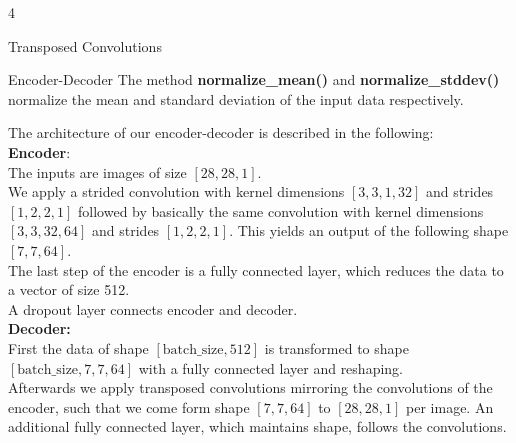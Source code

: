 \documentclass{article}
\begin{document}
    \begin{ukon-infie}[28.1.18]{4}

		
		\begin{exercise}[p=20]{Transposed Convolutions}
		\question{}
		{
			
		}
		\question{}
		{
			
		}
		\question{}
		{
			
		}
		\end{exercise}
		
		\begin{exercise}[p=60]{Encoder-Decoder}
		\question{}
		{
		The method \textbf{normalize\_mean()} and \textbf{normalize\_stddev()} normalize the mean and standard deviation of the input data respectively.
		}
		\question{}
		{		
		The architecture of our encoder-decoder is described in the following:\\
		\textbf{Encoder}:\\
		The inputs are images of size $[28 , 28 , 1]$.\\
		We apply a strided convolution with kernel dimensions $[3,3,1,32]$ and strides $[1,2,2,1]$ followed by basically the same convolution with kernel dimensions $[3,3,32,64]$ and strides $[1,2,2,1]$. This yields an output of the following shape $[7,7,64]$.\\
		The last step of the encoder is a fully connected layer, which reduces the data to a vector of size 512.\\
		A dropout layer connects encoder and decoder.\\
		
		\textbf{Decoder:}\\
		First the data of shape $[\text{batch\_size},512 ]$ is transformed to shape $[\text{batch\_size},7,7,64 ]$ with a fully connected layer and reshaping.\\
		Afterwards we apply transposed convolutions mirroring the convolutions of the encoder, such that we come form shape $[7,7,64]$ to $[28,28,1]$ per image. An additional fully connected layer, which maintains shape, follows the convolutions.
		
}
\end{exercise}
\end{ukon-infie}
\end{document}
